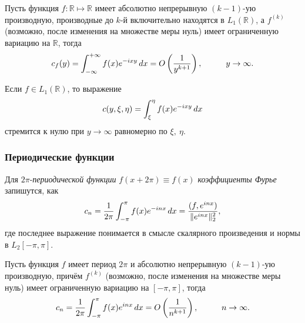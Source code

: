 \begin{to_con}
    Пусть функция $f \colon \mathbb{R} \mapsto \mathbb{R}$ имеет абсолютно непрерывную $(k-1)$-ую производную, производные до $k$-й включительно находятся в $L_1 (\mathbb{R})$, а $f^{(k)}$ (возможно, после изменения на множестве меры нуль) имеет ограниченную вариацию на $\mathbb{R}$, тогда
    \begin{equation*}
        c_f (y) = \int_{-\infty}^{+\infty} 
        f(x) e^{-ixy} \, d x =
        O\left(\frac{1}{y^{k+1}}\right), 
        \hspace{1 cm}
        y \to \infty.
    \end{equation*}
\end{to_con}



\begin{to_thr}
    Если $f \in L_1(\mathbb{R})$, то выражение
    \begin{equation*}
        c(y, \xi, \eta) = \int_\xi^\eta f(x) e^{-ixy} \, d x
    \end{equation*}
    стремится к нулю при $y \to \infty$ равномерно по $\xi, \ \eta$.
\end{to_thr}


\subsubsection*{Периодические функции}


\begin{to_def}
    Для $2\pi$-\textit{периодической функции}  $f(x+2\pi) \equiv f(x)$ \textit{коэффициенты Фурье}  запишутся, как
    \begin{equation*}
        c_n = \frac{1}{2\pi} \int_{-\pi}^{\pi} 
        f(x) e^{-inx} \, d x = 
        \frac{
        (f, e^{inx})
        }{
        \|e^{inx}\|_2^2
        },
    \end{equation*}
    где последнее выражение понимается в смысле скалярного произведения и нормы в $L_2 [-\pi, \pi]$.
\end{to_def}

\begin{to_thr}[]
    Пусть функция $f$ имеет период $2 \pi$ и абсолютно непрерывную $(k-1)$-ую производную, причём $f^(k)$ (возможно, после изменения на множестве меры нуль) имеет ограниченную вариацию на $[-\pi, \pi]$, тогда
    \begin{equation*}
        c_n = \frac{1}{2\pi} \int_{-\pi}^{\pi} f(x) e^{inx} \, d x =
        O\left(\frac{1}{n^{k+1}}\right),
        \hspace{1 cm}
        n \to \infty.
    \end{equation*}
\end{to_thr}


